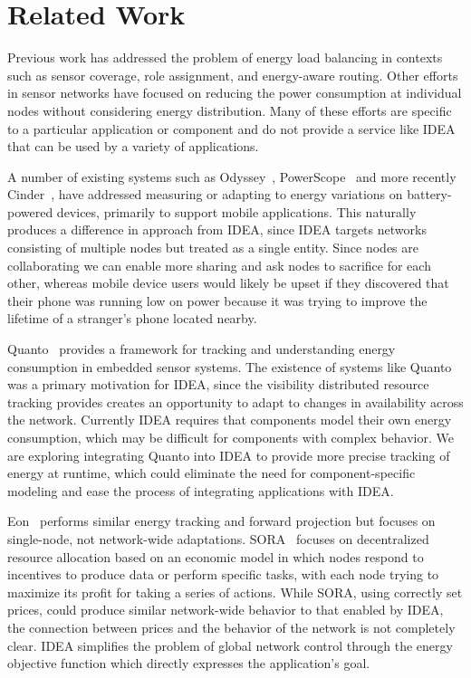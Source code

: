 \section{Related Work}
\label{idea-sec-related}

Previous work has addressed the problem of energy load balancing in contexts
such as sensor coverage, role assignment, and energy-aware routing. Other
efforts in sensor networks have focused on reducing the power consumption at
individual nodes without considering energy distribution. Many of these
efforts are specific to a particular application or component and do not
provide a service like IDEA that can be used by a variety of applications. 

A number of existing systems such as Odyssey~\cite{odyssey-osr99},
PowerScope~\cite{powerscope-wmcsa99} and more recently
Cinder~\cite{cinder-mobiheld09}, have addressed measuring or adapting to
energy variations on battery-powered devices, primarily to support mobile
applications. This naturally produces a difference in approach from IDEA,
since IDEA targets networks consisting of multiple nodes but treated as a
single entity. Since nodes are collaborating we can enable more sharing and
ask nodes to sacrifice for each other, whereas mobile device users would
likely be upset if they discovered that their phone was running low on power
because it was trying to improve the lifetime of a stranger's phone located
nearby.

Quanto~\cite{quanto-osdi08} provides a framework for tracking and
understanding energy consumption in embedded sensor systems. The existence of
systems like Quanto was a primary motivation for IDEA, since the visibility
distributed resource tracking provides creates an opportunity to adapt to
changes in availability across the network. Currently IDEA requires that
components model their own energy consumption, which may be difficult for
components with complex behavior. We are exploring integrating Quanto into
IDEA to provide more precise tracking of energy at runtime, which could
eliminate the need for component-specific modeling and ease the process of
integrating applications with IDEA.

Eon~\cite{eon-sensys07} performs similar energy tracking and forward
projection but focuses on single-node, not network-wide adaptations.
SORA~\cite{sora-nsdi05} focuses on decentralized resource allocation based on
an economic model in which nodes respond to incentives to produce data or
perform specific tasks, with each node trying to maximize its profit for
taking a series of actions. While SORA, using correctly set prices, could
produce similar network-wide behavior to that enabled by IDEA, the connection
between prices and the behavior of the network is not completely clear. IDEA
simplifies the problem of global network control through the energy objective
function which directly expresses the application's goal.

